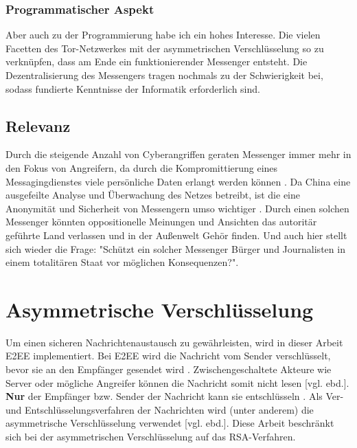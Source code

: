 \documentclass[a4paper,ngerman, headheight=28pt,12pt]{scrartcl}
\newcommand{\vcite}[1]{\cite[vgl.][]{#1}}
\newcommand{\vebd}{[vgl. ebd.]}
\begin{document}
\subsubsection{Programmatischer Aspekt}
Aber auch zu der Programmierung habe ich ein hohes Interesse. Die vielen Facetten des Tor-Netzwerkes mit der asymmetrischen Verschlüsselung so zu verknüpfen, dass am Ende ein funktionierender Messenger entsteht. Die Dezentralisierung des Messengers tragen nochmals zu der Schwierigkeit bei, sodass fundierte Kenntnisse der Informatik erforderlich sind.

\subsection{Relevanz}
Durch die steigende Anzahl von Cyberangriffen geraten  Messenger immer mehr in den Fokus von Angreifern, da durch die Kompromittierung eines Messagingdienstes viele persönliche Daten erlangt werden können \vcite{Cyberattacks}. Da China eine ausgefeilte Analyse und Überwachung des Netzes betreibt, ist die eine Anonymität und Sicherheit von Messengern umso wichtiger \vcite{GreatFirewallChina}. Durch einen solchen Messenger könnten oppositionelle Meinungen und Ansichten das autoritär geführte Land verlassen und in der Außenwelt Gehör finden. Und auch hier stellt sich wieder die Frage: "Schützt ein solcher Messenger Bürger und Journalisten in einem totalitären Staat vor möglichen Konsequenzen?".

\section{Asymmetrische Verschlüsselung}
Um einen sicheren Nachrichtenaustausch zu gewährleisten, wird in dieser Arbeit E2EE implementiert. Bei E2EE wird die Nachricht vom Sender verschlüsselt, bevor sie an den Empfänger gesendet wird \vcite{E2EE}. Zwischengeschaltete Akteure wie Server oder mögliche Angreifer können die Nachricht somit nicht lesen \vebd. \textbf{Nur} der Empfänger bzw. Sender der Nachricht kann sie entschlüsseln \vcite{E2EE-Method}. Als Ver- und Entschlüsselungsverfahren der Nachrichten wird (unter anderem) die asymmetrische Verschlüsselung verwendet \vebd. Diese Arbeit beschränkt sich bei der asymmetrischen Verschlüsselung auf das RSA-Verfahren.
\end{document}
